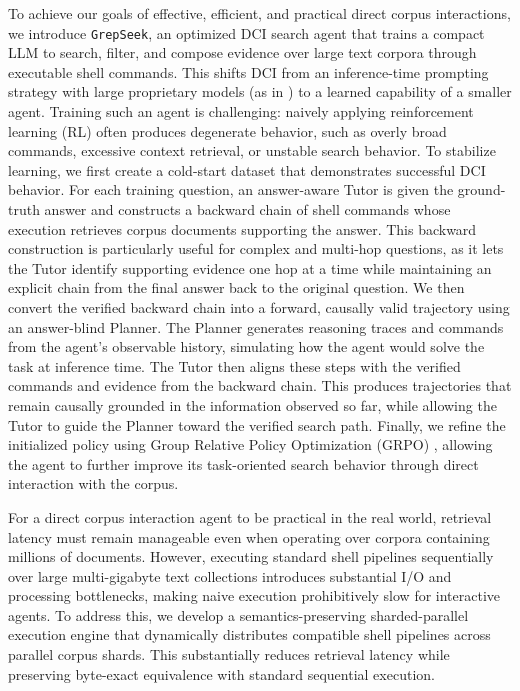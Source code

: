 \documentclass{llmxive}
\providecommand{\ourmethod}{\texttt{GrepSeek}\xspace}
\begin{document}
To achieve our goals of effective, efficient, and practical direct corpus interactions, we introduce \ourmethod{}, an optimized DCI search agent that trains a compact LLM to search, filter, and compose evidence over large text corpora through executable shell commands. This shifts DCI from an inference-time prompting strategy with large proprietary models (as in \citep{dci-agent}) to a learned capability of a smaller agent. Training such an agent is challenging: naively applying reinforcement learning (RL) often produces degenerate behavior, such as overly broad commands, excessive context retrieval, or unstable search behavior. To stabilize learning, we first create a cold-start dataset that demonstrates successful DCI behavior. For each training question, an answer-aware Tutor is given the ground-truth answer and constructs a backward chain of shell commands whose execution retrieves corpus documents supporting the answer. This backward construction is particularly useful for complex and multi-hop questions, as it lets the Tutor identify supporting evidence one hop at a time while maintaining an explicit chain from the final answer back to the original question. We then convert the verified backward chain into a forward, causally valid trajectory using an answer-blind Planner. The Planner generates reasoning traces and commands from the agent's observable history, simulating how the agent would solve the task at inference time. The Tutor then aligns these steps with the verified commands and evidence from the backward chain. This produces trajectories that remain causally grounded in the information observed so far, while allowing the Tutor to guide the Planner toward the verified search path. Finally, we refine the initialized policy using Group Relative Policy Optimization (GRPO) \citep{grpo}, allowing the agent to further improve its task-oriented search behavior through direct interaction with the corpus.



For a direct corpus interaction agent to be practical in the real world, retrieval latency must remain manageable even when operating over corpora containing millions of documents. However, executing standard shell pipelines sequentially over large multi-gigabyte text collections introduces substantial I/O and processing bottlenecks, making naive execution prohibitively slow for interactive agents. To address this, we develop a semantics-preserving sharded-parallel execution engine that dynamically distributes compatible shell pipelines across parallel corpus shards. This substantially reduces retrieval latency while preserving byte-exact equivalence with standard sequential execution.
\end{document}
